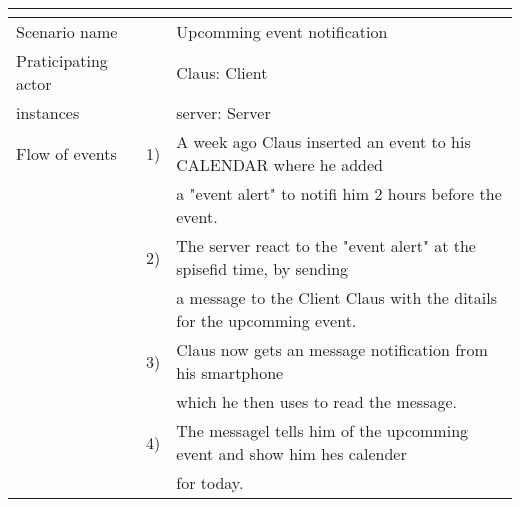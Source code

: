 \documentclass{article}
\begin{document}
\begin{tabular}{l r @{} l}
	\multicolumn{2}{c}{} \\
	\hline
	Scenario name	&&Upcomming event notification\\
	\hline
	Praticipating actor	&&Claus: Client \\
	instances       	&&server: Server\\
	\hline
	Flow of events	&1)&A week ago Claus inserted an event to his CALENDAR where he added\\ 
					&&a "event alert" to notifi him 2 hours before the event.\\
				&2)&The server react to the "event alert" at the spisefid time, by sending\\
					&&a message to the Client Claus with the ditails for the upcomming event.\\
				&3)&Claus now gets an message notification from his smartphone\\ 
					&&which he then uses to read the message.\\
				&4)&The messagel tells him of the upcomming event and show him hes calender\\
					&&for today.\\
	\hline
\end{tabular}
\end{document}
